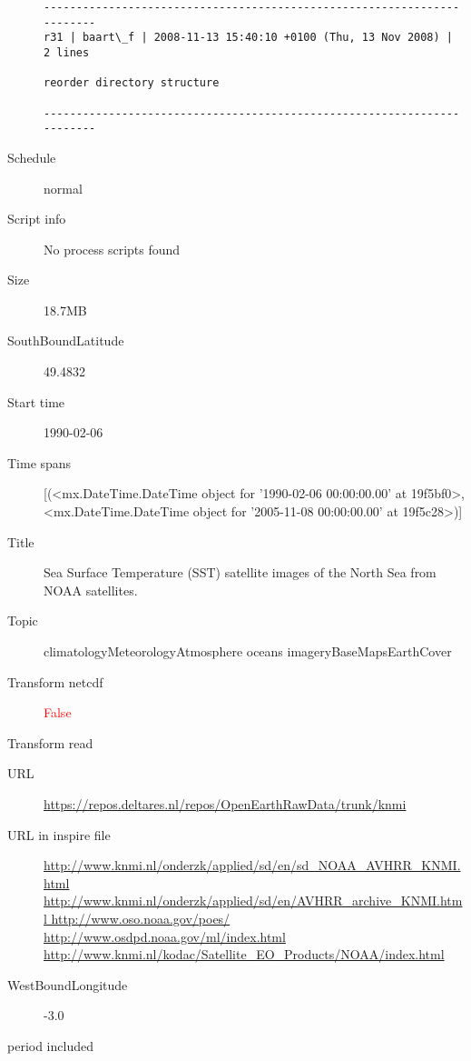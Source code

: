 \documentclass[9]{report}
\begin{document}
\begin{description}
\begin{verbatim}
------------------------------------------------------------------------
r31 | baart\_f | 2008-11-13 15:40:10 +0100 (Thu, 13 Nov 2008) | 2 lines

reorder directory structure

------------------------------------------------------------------------

\end{verbatim}
  \item[Schedule] normal
  \item[Script info] No process scripts found
  \item[Size] 18.7MB
  \item[SouthBoundLatitude] 49.4832
  \item[Start time] 1990-02-06
  \item[Time spans] [(<mx.DateTime.DateTime object for '1990-02-06 00:00:00.00' at 19f5bf0>, <mx.DateTime.DateTime object for '2005-11-08 00:00:00.00' at 19f5c28>)]
  \item[Title]  Sea Surface Temperature (SST) satellite images of the North Sea from NOAA satellites. 
  \item[Topic] climatologyMeteorologyAtmosphere oceans imageryBaseMapsEarthCover
  \item[Transform netcdf] \textcolor{red}{False}
  \item[Transform read] \textcolor{blue}{}
  \item[URL] \href{https://repos.deltares.nl/repos/OpenEarthRawData/trunk/knmi}{https://repos.deltares.nl/repos/OpenEarthRawData/trunk/knmi}
  \item[URL in inspire file] \href{http://www.knmi.nl/onderzk/applied/sd/en/sd\_NOAA\_AVHRR\_KNMI.html http://www.knmi.nl/onderzk/applied/sd/en/AVHRR\_archive\_KNMI.html http://www.oso.noaa.gov/poes/ http://www.osdpd.noaa.gov/ml/index.html http://www.knmi.nl/kodac/Satellite\_EO\_Products/NOAA/index.html}{http://www.knmi.nl/onderzk/applied/sd/en/sd\_NOAA\_AVHRR\_KNMI.html http://www.knmi.nl/onderzk/applied/sd/en/AVHRR\_archive\_KNMI.html http://www.oso.noaa.gov/poes/ http://www.osdpd.noaa.gov/ml/index.html http://www.knmi.nl/kodac/Satellite\_EO\_Products/NOAA/index.html}
  \item[WestBoundLongitude] -3.0
  \item[period included] 
\end{description}
\end{document}
